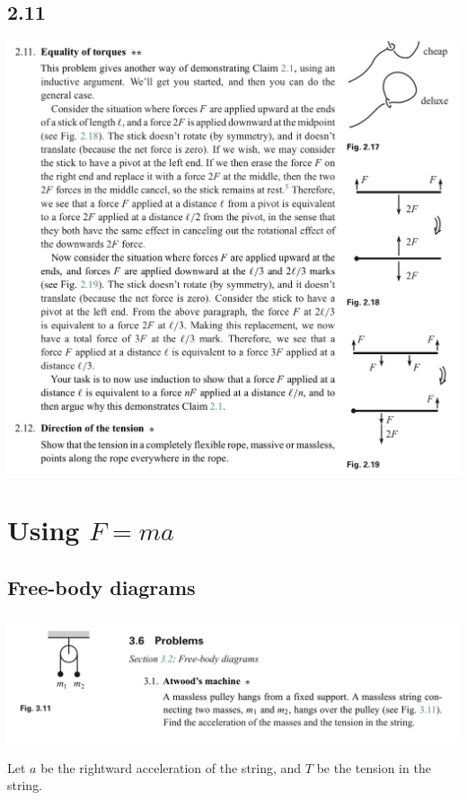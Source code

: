 \newpage
\subsection*{2.11}
\begin{mdframed}
  \includegraphics[width=400pt]{img/physics--classical-mechanics--morin--2-11.png}
\end{mdframed}
\newpage
\section{Using $F = ma$}
\subsection*{Free-body diagrams}
\subsubsection*{}
\begin{mdframed}
  \includegraphics[width=400pt]{img/physics--classical-mechanics--morin--3-1.png}
\end{mdframed}
Let $a$ be the rightward acceleration of the string, and $T$ be the tension in the string.

